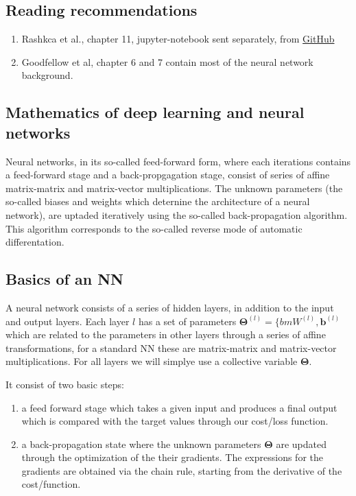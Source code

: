 \documentclass[%
oneside,                 %
final,                   %
10pt]{article}
\begin{document}
\subsection{Reading recommendations}

\begin{enumerate}
\item Rashkca et al., chapter 11, jupyter-notebook sent separately, from \href{{https://github.com/rasbt/machine-learning-book}}{GitHub}

\item Goodfellow et al, chapter 6 and 7 contain most of the neural network background.
\end{enumerate}

\noindent
\subsection{Mathematics of deep learning and neural networks}

Neural networks, in its so-called feed-forward form, where each
iterations contains a feed-forward stage and a back-propgagation
stage, consist of series of affine matrix-matrix and matrix-vector
multiplications. The unknown parameters (the so-called biases and
weights which deternine the architecture of a neural network), are
uptaded iteratively using the so-called back-propagation algorithm.
This algorithm corresponds to the so-called reverse mode of 
automatic differentation. 

\subsection{Basics of an NN}

A neural network consists of a series of hidden layers, in addition to
the input and output layers.  Each layer $l$ has a set of parameters
$\bm{\Theta}^{(l)}=\{bm{W}^{(l)},\bm{b}^{(l)}$ which are related to the
parameters in other layers through a series of affine transformations,
for a standard NN these are matrix-matrix and matrix-vector
multiplications.  For all layers we will simplye use a collective variable $\bm{\Theta}$.

It consist of two basic steps:
\begin{enumerate}
\item a feed forward stage which takes a given input and produces a final output which is compared with the target values through our cost/loss function.

\item a back-propagation state where the unknown parameters $\bm{\Theta}$ are updated through the optimization of the their gradients. The expressions for the gradients are obtained via the chain rule, starting from the derivative of the cost/function.
\end{enumerate}
\end{document}
